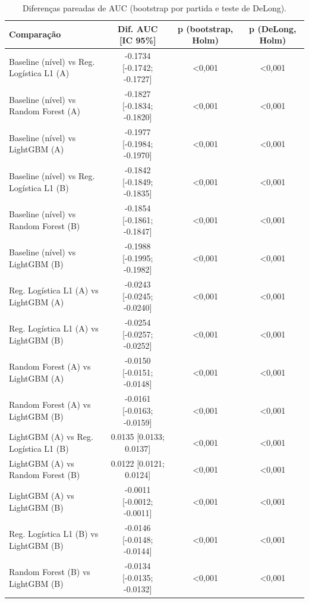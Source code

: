\begin{table}[htbp]
\caption{Diferenças pareadas de AUC (bootstrap por partida e teste de DeLong).}
\label{tab:comparacoes}
\centering
\small
\begin{tabular}{lccc}
\toprule
Comparação & Dif. AUC [IC 95\%] & p (bootstrap, Holm) & p (DeLong, Holm) \\
\midrule
Baseline (nível) vs Reg. Logística L1 (A) & -0.1734 [-0.1742; -0.1727] & <0,001 & <0,001 \\
Baseline (nível) vs Random Forest (A) & -0.1827 [-0.1834; -0.1820] & <0,001 & <0,001 \\
Baseline (nível) vs LightGBM (A) & -0.1977 [-0.1984; -0.1970] & <0,001 & <0,001 \\
Baseline (nível) vs Reg. Logística L1 (B) & -0.1842 [-0.1849; -0.1835] & <0,001 & <0,001 \\
Baseline (nível) vs Random Forest (B) & -0.1854 [-0.1861; -0.1847] & <0,001 & <0,001 \\
Baseline (nível) vs LightGBM (B) & -0.1988 [-0.1995; -0.1982] & <0,001 & <0,001 \\
Reg. Logística L1 (A) vs LightGBM (A) & -0.0243 [-0.0245; -0.0240] & <0,001 & <0,001 \\
Reg. Logística L1 (A) vs LightGBM (B) & -0.0254 [-0.0257; -0.0252] & <0,001 & <0,001 \\
Random Forest (A) vs LightGBM (A) & -0.0150 [-0.0151; -0.0148] & <0,001 & <0,001 \\
Random Forest (A) vs LightGBM (B) & -0.0161 [-0.0163; -0.0159] & <0,001 & <0,001 \\
LightGBM (A) vs Reg. Logística L1 (B) & 0.0135 [0.0133; 0.0137] & <0,001 & <0,001 \\
LightGBM (A) vs Random Forest (B) & 0.0122 [0.0121; 0.0124] & <0,001 & <0,001 \\
LightGBM (A) vs LightGBM (B) & -0.0011 [-0.0012; -0.0011] & <0,001 & <0,001 \\
Reg. Logística L1 (B) vs LightGBM (B) & -0.0146 [-0.0148; -0.0144] & <0,001 & <0,001 \\
Random Forest (B) vs LightGBM (B) & -0.0134 [-0.0135; -0.0132] & <0,001 & <0,001 \\
\bottomrule
\end{tabular}
\end{table}
